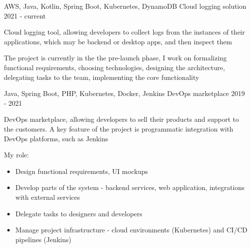 

\begin{cventries}

    \cventry
    {AWS, Java, Kotlin, Spring Boot, Kubernetes, DynamoDB}
    {Cloud logging solution}
    {}
    {2021 - current}
    {
        \begin{cvitems} %
            \item Cloud logging tool, allowing developers to collect logs from the instances of their applications, which may be backend or desktop apps, and then inspect them
            \item The project is currently in the the pre-launch phase, I work on formalizing functional requirements, choosing technologies, designing the architecture, delegating tasks to the team, implementing the core functionality
        \end{cvitems}
    }

    \cventry
    {Java, Spring Boot, PHP, Kubernetes, Docker, Jenkins}
    {DevOps marketplace}
    {}
    {2019 - 2021}
    {
        \begin{cvitems} %
            \item DevOps marketplace, allowing developers to sell their products and support to the customers. A key feature of the project is programmatic integration with DevOps platforms, such as Jenkins
            \item My role:
            \begin{itemize}[label={•},leftmargin=10pt]
                \item Design functional requirements, UI mockups
                \item Develop parts of the system - backend services, web application, integrations with external services
                \item Delegate tasks to designers and developers
                \item Manage project infrastructure - cloud environments (Kubernetes) and CI/CD pipelines (Jenkins)
            \end{itemize}
        \end{cvitems}
    }


\end{cventries}
